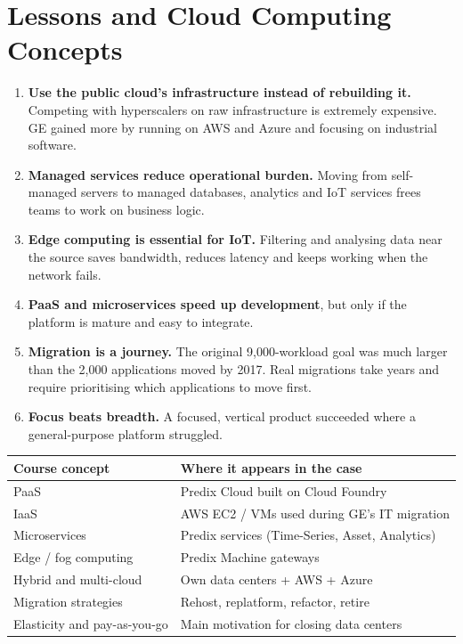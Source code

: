 \documentclass[12pt,a4paper]{article}
\begin{document}
\section{Lessons and Cloud Computing Concepts}
\begin{enumerate}
  \item \textbf{Use the public cloud's infrastructure instead of rebuilding it.} Competing with hyperscalers on raw
        infrastructure is extremely expensive. GE gained more by running on AWS and Azure and focusing on
        industrial software.
  \item \textbf{Managed services reduce operational burden.} Moving from self-managed servers to managed databases,
        analytics and IoT services frees teams to work on business logic.
  \item \textbf{Edge computing is essential for IoT.} Filtering and analysing data near the source saves bandwidth,
        reduces latency and keeps working when the network fails.
  \item \textbf{PaaS and microservices speed up development}, but only if the platform is mature and easy to integrate.
  \item \textbf{Migration is a journey.} The original 9,000-workload goal was much larger than the 2,000 applications
        moved by 2017. Real migrations take years and require prioritising which applications to move first.
  \item \textbf{Focus beats breadth.} A focused, vertical product succeeded where a general-purpose platform struggled.
\end{enumerate}

\begin{center}
\begin{tabularx}{\linewidth}{@{}p{4.2cm}L@{}}
\toprule
\textbf{Course concept} & \textbf{Where it appears in the case} \\
\midrule
PaaS & Predix Cloud built on Cloud Foundry \\
IaaS & AWS EC2 / VMs used during GE's IT migration \\
Microservices & Predix services (Time-Series, Asset, Analytics) \\
Edge / fog computing & Predix Machine gateways \\
Hybrid and multi-cloud & Own data centers + AWS + Azure \\
Migration strategies & Rehost, replatform, refactor, retire \\
Elasticity and pay-as-you-go & Main motivation for closing data centers \\
\bottomrule
\end{tabularx}
\end{center}
\end{document}
